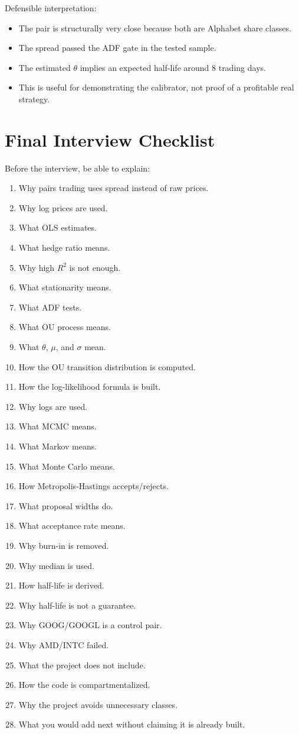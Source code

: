 \documentclass[11pt]{article}
\begin{document}
Defensible interpretation:

\begin{itemize}
  \item The pair is structurally very close because both are Alphabet share
  classes.
  \item The spread passed the ADF gate in the tested sample.
  \item The estimated $\theta$ implies an expected half-life around 8 trading
  days.
  \item This is useful for demonstrating the calibrator, not proof of a
  profitable real strategy.
\end{itemize}

\section{Final Interview Checklist}

Before the interview, be able to explain:

\begin{enumerate}
  \item Why pairs trading uses spread instead of raw prices.
  \item Why log prices are used.
  \item What OLS estimates.
  \item What hedge ratio means.
  \item Why high $R^2$ is not enough.
  \item What stationarity means.
  \item What ADF tests.
  \item What OU process means.
  \item What $\theta$, $\mu$, and $\sigma$ mean.
  \item How the OU transition distribution is computed.
  \item How the log-likelihood formula is built.
  \item Why logs are used.
  \item What MCMC means.
  \item What Markov means.
  \item What Monte Carlo means.
  \item How Metropolis-Hastings accepts/rejects.
  \item What proposal widths do.
  \item What acceptance rate means.
  \item Why burn-in is removed.
  \item Why median is used.
  \item How half-life is derived.
  \item Why half-life is not a guarantee.
  \item Why GOOG/GOOGL is a control pair.
  \item Why AMD/INTC failed.
  \item What the project does not include.
  \item How the code is compartmentalized.
  \item Why the project avoids unnecessary classes.
  \item What you would add next without claiming it is already built.
\end{enumerate}
\end{document}
